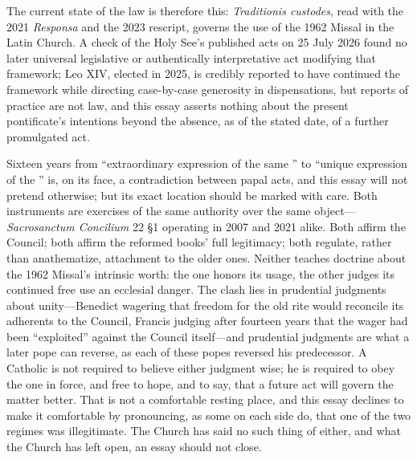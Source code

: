 The current state of the law is therefore this: \emph{Traditionis custodes}, read with the 2021 \emph{Responsa} and the 2023 rescript, governs the use of the 1962 Missal in the Latin Church. A check of the Holy See's published acts on 25 July 2026 found no later universal legislative or authentically interpretative act modifying that framework; Leo XIV, elected in 2025, is credibly reported to have continued the framework while directing case-by-case generosity in dispensations, but reports of practice are not law, and this essay asserts nothing about the present pontificate's intentions beyond the absence, as of the stated date, of a further promulgated act.

Sixteen years from ``extraordinary expression of the same '' to ``unique expression of the '' is, on its face, a contradiction between papal acts, and this essay will not pretend otherwise; but its exact location should be marked with care. Both instruments are exercises of the same authority over the same object---\emph{Sacrosanctum Concilium} 22 \S1 operating in 2007 and 2021 alike. Both affirm the Council; both affirm the reformed books' full legitimacy; both regulate, rather than anathematize, attachment to the older ones. Neither teaches doctrine about the 1962 Missal's intrinsic worth: the one honors its usage, the other judges its continued free use an ecclesial danger. The clash lies in prudential judgments about unity---Benedict wagering that freedom for the old rite would reconcile its adherents to the Council, Francis judging after fourteen years that the wager had been ``exploited'' against the Council itself---and prudential judgments are what a later pope can reverse, as each of these popes reversed his predecessor. A Catholic is not required to believe either judgment wise; he is required to obey the one in force, and free to hope, and to say, that a future act will govern the matter better. That is not a comfortable resting place, and this essay declines to make it comfortable by pronouncing, as some on each side do, that one of the two regimes was illegitimate. The Church has said no such thing of either, and what the Church has left open, an essay should not close.

